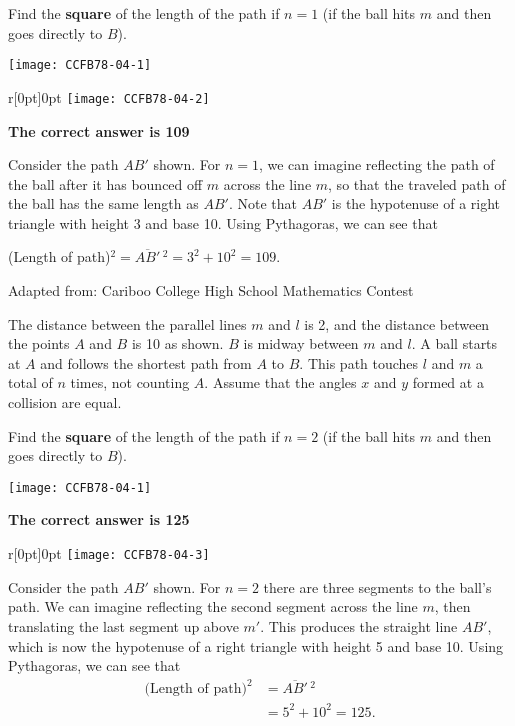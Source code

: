 \documentclass{article}
\begin{document}
Find the \textbf{square} of the length of the path if $n=1$ (if the ball hits $m$ and then goes directly to $B$).

\begin{center}
	\texttt{[image: CCFB78-04-1]}
\end{center}

\begin{wrapfigure}{r}[0pt]{0pt}
	\texttt{[image: CCFB78-04-2]}
\end{wrapfigure}
\textbf{The correct answer is 109}

Consider the path $AB'$ shown. For $n=1$, we can imagine reflecting the path of the ball after it has bounced off $m$ across the line $m$, so that the traveled path of the ball has the same length as $AB'$. Note that $AB'$ is the hypotenuse of a right triangle with height 3 and base 10. Using Pythagoras, we can see that

\begin{center}
	(Length of path)$^2 = \overline{AB'}\,^2 = 3^2 + 10^2 = 109$.
\end{center}

\vskip 1.5cm


\scriptsize
Adapted from: Cariboo College High School Mathematics Contest

\normalsize
The distance between the parallel lines $m$ and $l$ is 2, and the distance between the points $A$ and $B$ is 10 as shown. $B$ is midway between $m$ and $l$. A ball starts at $A$ and follows the shortest path from $A$ to $B$. This path touches $l$ and $m$ a total of $n$ times, not counting $A$. Assume that the angles $x$ and $y$ formed at a collision are equal.

Find the \textbf{square} of the length of the path if $n=2$ (if the ball hits $m$ and then goes directly to $B$).

\begin{center}
	\texttt{[image: CCFB78-04-1]}
\end{center}

\textbf{The correct answer is 125}

\begin{wrapfigure}{r}[0pt]{0pt}
	\texttt{[image: CCFB78-04-3]}
\end{wrapfigure}
Consider the path $AB'$ shown. For $n=2$ there are three segments to the ball's path. We can imagine reflecting the second segment across the line $m$, then translating the last segment up above $m'$. This produces the straight line $AB'$, which is now the hypotenuse of a right triangle with height 5 and base 10. Using Pythagoras, we can see that
\begin{align*}
	\text{(Length of path)}^2 &= \overline{AB'}\,^2\\
	&= 5^2 + 10^2 = 125.
\end{align*}

\end{document}
